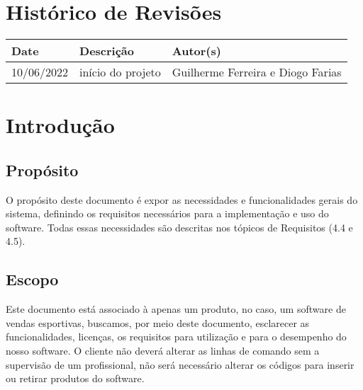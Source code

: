 \documentclass{article}
\begin{document}

\capa\newpage

\section*{\center Histórico de Revisões}
  \vspace*{1cm}
  \begin{table}[ht]
    \centering
    \begin{tabular}[pos]{|m{2cm} | m{7.2cm} | m{3.8cm}|} 
      \hline
      \cellcolor[gray]{0.9}
      \textbf{Date} & \cellcolor[gray]{0.9}\textbf{Descrição} & \cellcolor[gray]{0.9}\textbf{Autor(s)}\\ \hline
      \hline
      \small 10/06/2022 & \small início do projeto & \small Guilherme Ferreira e Diogo Farias \\ \hline      
    \end{tabular}
  \end{table}

\newpage

\tableofcontents
\newpage

\section{Introdução}


\subsection{Propósito}
O propósito deste documento é expor as necessidades e funcionalidades gerais
do sistema, definindo os requisitos necessários para a implementação e uso do software.
Todas essas necessidades são descritas nos tópicos de Requisitos (4.4 e 4.5).


\subsection{Escopo}
Este documento está associado à apenas um produto, no caso, um software de vendas esportivas, buscamos, por meio deste documento, esclarecer as funcionalidades, licenças, os requisitos para utilização e para o desempenho do nosso software. O cliente não deverá alterar as linhas de comando sem a supervisão de um profissional, não será necessário alterar os códigos para inserir ou retirar produtos do software.
\end{document}
